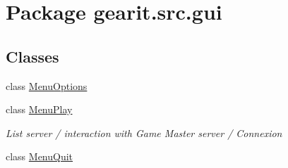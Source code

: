 \hypertarget{namespacegearit_1_1src_1_1gui}{\section{Package gearit.\+src.\+gui}
\label{namespacegearit_1_1src_1_1gui}
}
\subsection*{Classes}
\begin{DoxyCompactItemize}
\item 
class \hyperlink{classgearit_1_1src_1_1gui_1_1_menu_options}{Menu\+Options}
\item 
class \hyperlink{classgearit_1_1src_1_1gui_1_1_menu_play}{Menu\+Play}
\begin{DoxyCompactList}\small\item\em List server / interaction with Game Master server / Connexion \end{DoxyCompactList}\item 
class \hyperlink{classgearit_1_1src_1_1gui_1_1_menu_quit}{Menu\+Quit}
\end{DoxyCompactItemize}
